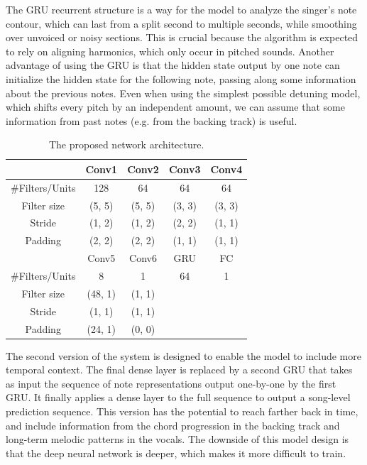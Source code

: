 The GRU recurrent structure is a way for the model to analyze the singer's note contour, which can last from a split second to multiple seconds, while smoothing over unvoiced or noisy sections. This is crucial because the algorithm is expected to rely on aligning harmonics, which only occur in pitched sounds. Another advantage of using the GRU is that the hidden state output by one note can initialize the hidden state for the following note, passing along some information about the previous notes. Even when using the simplest possible detuning model, which shifts every pitch by an independent amount, we can assume that some information from past notes (e.g. from the backing track) is useful.

\begin{table}[t]
  \begin{center}
    \caption{The proposed network architecture.}
    \begin{tabular}{|c||c|c|c|c|}
    \hline
      & Conv1 & Conv2 & Conv3 & Conv4 \\
      \hline
      \#Filters/Units & 128 & 64 & 64 & 64 \\
      Filter size & (5, 5) & (5, 5) & (3, 3) & (3, 3) \\
      Stride & (1, 2) & (1, 2) & (2, 2) & (1, 1) \\
      Padding & (2, 2) & (2, 2) & (1, 1) & (1, 1) \\
      \hline
      & Conv5 & Conv6 & GRU & FC \\
      \hline
      \#Filters/Units & 8 & 1 & 64 & 1 \\
      Filter size & (48, 1) & (1, 1) & & \\
      Stride & (1, 1) & (1, 1) & & \\
      Padding & (24, 1) & (0, 0) & & \\
      \hline
    \end{tabular}
    \vspace{-.1in}
    \label{tab:network}
  \end{center}
\end{table}

The second version of the system is designed to enable the model to include more temporal context. The final dense layer is replaced by a second GRU that takes as input the sequence of note representations output one-by-one by the first GRU. It finally applies a dense layer to the full sequence to output a song-level prediction sequence. This version has the potential to reach farther back in time, and include information from the chord progression in the backing track and long-term melodic patterns in the vocals. The downside of this model design is that the deep neural network is deeper, which makes it more difficult to train. 


